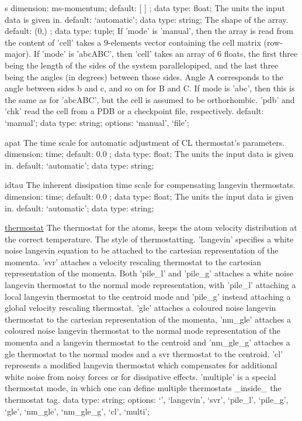 \begin{ipifield}{}
\begin{ipifield}{s}
{dimension: ms-momentum; default:  [ ] ; data type: float; }%
{%
{The units the input data is given in.}%
{default: `automatic'; data type: string; }%
%
{The shape of the array.}%
{default:  (0,) ; data type: tuple; }%
%
{If 'mode' is 'manual', then the array is read from the content of 'cell' takes a 9-elements vector containing the cell matrix (row-major). If 'mode' is 'abcABC', then 'cell' takes an array of 6 floats, the first three being the length of the sides of the system parallelopiped, and the last three being the angles (in degrees) between those sides. Angle A corresponds to the angle between sides b and c, and so on for B and C. If mode is 'abc', then this is the same as for 'abcABC', but the cell is assumed to be orthorhombic. 'pdb' and 'chk' read the cell from a PDB or a checkpoint file, respectively.}%
{default: `manual'; data type: string; options: `manual', `file'; }%
}
\end{ipifield}
\begin{ipifield}{apat}%
{The time scale for automatic adjustment of CL thermostat's parameters.}%
{dimension: time; default:  0.0 ; data type: float; }%
{%
{The units the input data is given in.}%
{default: `automatic'; data type: string; }%
}
\end{ipifield}
\begin{ipifield}{idtau}%
{The inherent dissipation time scale for compensating langevin thermostats.}%
{dimension: time; default:  0.0 ; data type: float; }%
{%
{The units the input data is given in.}%
{default: `automatic'; data type: string; }%
}
\end{ipifield}
\begin{ipifield}{\hyperref[THERMOSTATS]{thermostat}}%
{The thermostat for the atoms, keeps the atom velocity distribution at the correct temperature.}%
{}%
{%
{The style of thermostatting. 'langevin' specifies a white noise langevin equation to be attached to the cartesian representation of the momenta. 'svr' attaches a velocity rescaling thermostat to the cartesian representation of the momenta. Both 'pile\_l' and 'pile\_g' attaches a white noise langevin thermostat to the normal mode representation, with 'pile\_l' attaching a local langevin thermostat to the centroid mode and 'pile\_g' instead attaching a global velocity rescaling thermostat. 'gle' attaches a coloured noise langevin thermostat to the cartesian representation of the momenta, 'nm\_gle' attaches a coloured noise langevin thermostat to the normal mode representation of the momenta and a langevin thermostat to the centroid and 'nm\_gle\_g' attaches a gle thermostat to the normal modes and a svr thermostat to the centroid. 'cl' represents a modified langevin thermostat which compensates for additional white noise from noisy forces or for dissipative effects. 'multiple' is a special thermostat mode, in which one can define multiple thermostats \_inside\_ the thermostat tag.}%
{data type: string; options: `', `langevin', `svr', `pile\_l', `pile\_g', `gle', `nm\_gle', `nm\_gle\_g', `cl', `multi'; }%
}
\end{ipifield}
\end{ipifield}
